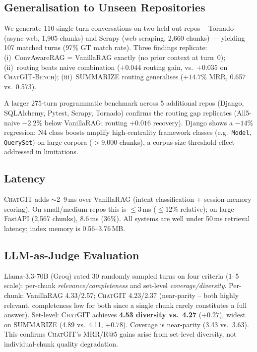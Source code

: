 \documentclass[conference]{IEEEtran}
\newcommand{\chatgit}{\textsc{ChatGIT}\xspace}
\newcommand{\conv}{\textsc{ChatGIT-Bench}\xspace}
\begin{document}
\subsection{Generalisation to Unseen Repositories}

We generate 110 single-turn conversations on two held-out repos --
Tornado (async web, 1,905 chunks) and Scrapy (web scraping, 2,660 chunks)
--- yielding 107 matched turns (97\% GT match rate).
Three findings replicate: (i)~ConvAwareRAG = VanillaRAG exactly (no prior
context at turn~0); (ii)~routing beats naive combination ($+0.044$ routing
gain, vs.\ $+0.035$ on \conv); (iii)~SUMMARIZE routing generalises
($+14.7\%$ MRR, 0.657 vs.\ 0.573).

A larger 275-turn programmatic benchmark across 5 additional repos
(Django, SQLAlchemy, Pytest, Scrapy, Tornado) confirms the routing gap
replicates (All5-naive $-2.2\%$ below VanillaRAG; routing $+0.016$
recovery). Django shows a $-14\%$ regression: N4 class boosts amplify
high-centrality framework classes (e.g.\ \texttt{Model}, \texttt{QuerySet})
on large corpora ($>$9,000 chunks), a corpus-size threshold effect
addressed in limitations.

\subsection{Latency}

\chatgit adds ${\sim}$2--9\,ms over VanillaRAG (intent classification +
session-memory scoring). On small/medium repos this is $\leq$3\,ms
($\leq$12\% relative); on large FastAPI (2,567 chunks), 8.6\,ms (36\%).
All systems are well under 50\,ms retrieval latency; index memory is
0.56--3.76\,MB.

\subsection{LLM-as-Judge Evaluation}

Llama-3.3-70B (Groq) rated 30 randomly sampled turns on four criteria
(1--5 scale): per-chunk \emph{relevance/completeness} and set-level
\emph{coverage/diversity}. Per-chunk: VanillaRAG 4.33/2.57;
\chatgit 4.23/2.37 (near-parity -- both highly relevant, completeness
low for both since a single chunk rarely constitutes a full answer).
Set-level: \chatgit achieves \textbf{4.53 diversity vs.\ 4.27}
($+0.27$), widest on SUMMARIZE (4.89 vs.\ 4.11, $+0.78$).
Coverage is near-parity (3.43 vs.\ 3.63). This confirms \chatgit's
MRR/R@5 gains arise from set-level diversity, not individual-chunk
quality degradation.
\end{document}
